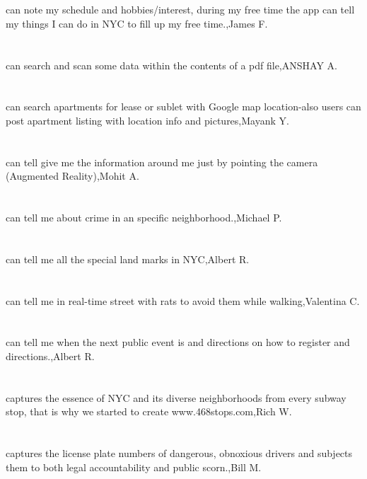 \section{}can note my schedule and hobbies/interest, during my free time the app can tell my things I can do in NYC to fill up my free time.,James F.
\section{}can search and scan some data within the contents of a pdf file,ANSHAY A.
\section{}can search apartments for lease or sublet with Google map location-also users can post apartment listing with location info and pictures,Mayank Y.
\section{}can tell give me the information around me just by pointing the camera (Augmented Reality),Mohit A.
\section{}can tell me about crime in an specific neighborhood.,Michael P.
\section{}can tell me all the special land marks in NYC,Albert R.
\section{}can tell me in real-time street with rats to avoid them while walking,Valentina C.	
\section{}can tell me when the next public event is and directions on how to register and directions.,Albert R.	
\section{}captures the essence of NYC and its diverse neighborhoods from every subway stop, that is why we started to create  www.468stops.com,Rich W.	
\section{}captures the license plate numbers of dangerous, obnoxious drivers and subjects them to both legal accountability and public scorn.,Bill M.	
